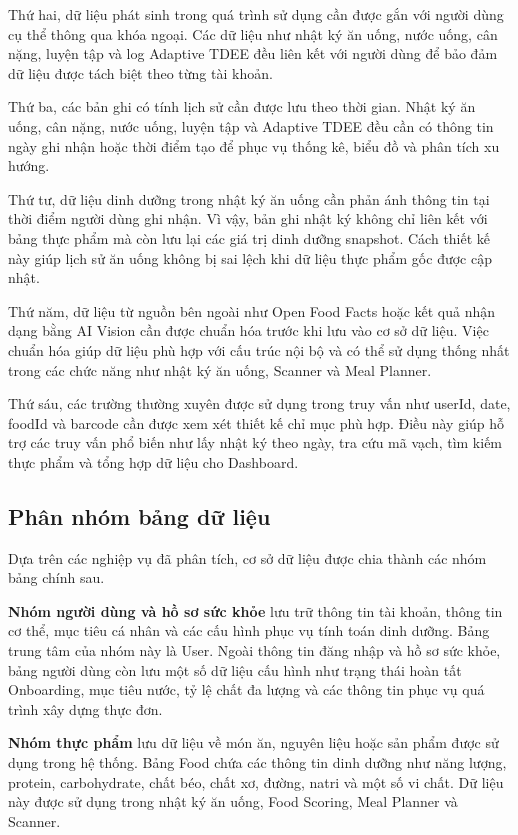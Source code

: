 \documentclass[12pt, a4paper]{report}
\begin{document}
Thứ hai, dữ liệu phát sinh trong quá trình sử dụng cần được gắn với người dùng cụ thể thông qua khóa ngoại. Các dữ liệu như nhật ký ăn uống, nước uống, cân nặng, luyện tập và log Adaptive TDEE đều liên kết với người dùng để bảo đảm dữ liệu được tách biệt theo từng tài khoản.

Thứ ba, các bản ghi có tính lịch sử cần được lưu theo thời gian. Nhật ký ăn uống, cân nặng, nước uống, luyện tập và Adaptive TDEE đều cần có thông tin ngày ghi nhận hoặc thời điểm tạo để phục vụ thống kê, biểu đồ và phân tích xu hướng.

Thứ tư, dữ liệu dinh dưỡng trong nhật ký ăn uống cần phản ánh thông tin tại thời điểm người dùng ghi nhận. Vì vậy, bản ghi nhật ký không chỉ liên kết với bảng thực phẩm mà còn lưu lại các giá trị dinh dưỡng snapshot. Cách thiết kế này giúp lịch sử ăn uống không bị sai lệch khi dữ liệu thực phẩm gốc được cập nhật.

Thứ năm, dữ liệu từ nguồn bên ngoài như Open Food Facts hoặc kết quả nhận dạng bằng AI Vision cần được chuẩn hóa trước khi lưu vào cơ sở dữ liệu. Việc chuẩn hóa giúp dữ liệu phù hợp với cấu trúc nội bộ và có thể sử dụng thống nhất trong các chức năng như nhật ký ăn uống, Scanner và Meal Planner.

Thứ sáu, các trường thường xuyên được sử dụng trong truy vấn như userId, date, foodId và barcode cần được xem xét thiết kế chỉ mục phù hợp. Điều này giúp hỗ trợ các truy vấn phổ biến như lấy nhật ký theo ngày, tra cứu mã vạch, tìm kiếm thực phẩm và tổng hợp dữ liệu cho Dashboard.

\subsection{Phân nhóm bảng dữ liệu}Dựa trên các nghiệp vụ đã phân tích, cơ sở dữ liệu được chia thành các nhóm bảng chính sau.

\textbf{Nhóm người dùng và hồ sơ sức khỏe} lưu trữ thông tin tài khoản, thông tin cơ thể, mục tiêu cá nhân và các cấu hình phục vụ tính toán dinh dưỡng. Bảng trung tâm của nhóm này là User. Ngoài thông tin đăng nhập và hồ sơ sức khỏe, bảng người dùng còn lưu một số dữ liệu cấu hình như trạng thái hoàn tất Onboarding, mục tiêu nước, tỷ lệ chất đa lượng và các thông tin phục vụ quá trình xây dựng thực đơn.

\textbf{Nhóm thực phẩm} lưu dữ liệu về món ăn, nguyên liệu hoặc sản phẩm được sử dụng trong hệ thống. Bảng Food chứa các thông tin dinh dưỡng như năng lượng, protein, carbohydrate, chất béo, chất xơ, đường, natri và một số vi chất. Dữ liệu này được sử dụng trong nhật ký ăn uống, Food Scoring, Meal Planner và Scanner.
\end{document}
